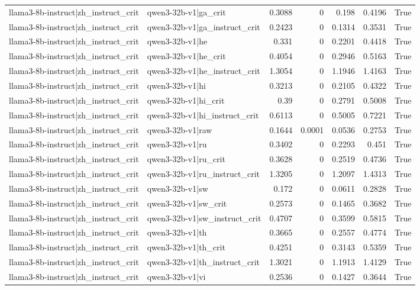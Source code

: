 \begin{table}
\begin{tabular}{l l r r r r l}
llama3-8b-instruct|zh_instruct_crit & qwen3-32b-v1|ga_crit & 0.3088 & 0 & 0.198 & 0.4196 & True \\
llama3-8b-instruct|zh_instruct_crit & qwen3-32b-v1|ga_instruct_crit & 0.2423 & 0 & 0.1314 & 0.3531 & True \\
llama3-8b-instruct|zh_instruct_crit & qwen3-32b-v1|he & 0.331 & 0 & 0.2201 & 0.4418 & True \\
llama3-8b-instruct|zh_instruct_crit & qwen3-32b-v1|he_crit & 0.4054 & 0 & 0.2946 & 0.5163 & True \\
llama3-8b-instruct|zh_instruct_crit & qwen3-32b-v1|he_instruct_crit & 1.3054 & 0 & 1.1946 & 1.4163 & True \\
llama3-8b-instruct|zh_instruct_crit & qwen3-32b-v1|hi & 0.3213 & 0 & 0.2105 & 0.4322 & True \\
llama3-8b-instruct|zh_instruct_crit & qwen3-32b-v1|hi_crit & 0.39 & 0 & 0.2791 & 0.5008 & True \\
llama3-8b-instruct|zh_instruct_crit & qwen3-32b-v1|hi_instruct_crit & 0.6113 & 0 & 0.5005 & 0.7221 & True \\
llama3-8b-instruct|zh_instruct_crit & qwen3-32b-v1|raw & 0.1644 & 0.0001 & 0.0536 & 0.2753 & True \\
llama3-8b-instruct|zh_instruct_crit & qwen3-32b-v1|ru & 0.3402 & 0 & 0.2293 & 0.451 & True \\
llama3-8b-instruct|zh_instruct_crit & qwen3-32b-v1|ru_crit & 0.3628 & 0 & 0.2519 & 0.4736 & True \\
llama3-8b-instruct|zh_instruct_crit & qwen3-32b-v1|ru_instruct_crit & 1.3205 & 0 & 1.2097 & 1.4313 & True \\
llama3-8b-instruct|zh_instruct_crit & qwen3-32b-v1|sw & 0.172 & 0 & 0.0611 & 0.2828 & True \\
llama3-8b-instruct|zh_instruct_crit & qwen3-32b-v1|sw_crit & 0.2573 & 0 & 0.1465 & 0.3682 & True \\
llama3-8b-instruct|zh_instruct_crit & qwen3-32b-v1|sw_instruct_crit & 0.4707 & 0 & 0.3599 & 0.5815 & True \\
llama3-8b-instruct|zh_instruct_crit & qwen3-32b-v1|th & 0.3665 & 0 & 0.2557 & 0.4774 & True \\
llama3-8b-instruct|zh_instruct_crit & qwen3-32b-v1|th_crit & 0.4251 & 0 & 0.3143 & 0.5359 & True \\
llama3-8b-instruct|zh_instruct_crit & qwen3-32b-v1|th_instruct_crit & 1.3021 & 0 & 1.1913 & 1.4129 & True \\
llama3-8b-instruct|zh_instruct_crit & qwen3-32b-v1|vi & 0.2536 & 0 & 0.1427 & 0.3644 & True \\

\end{tabular}
\end{table}
